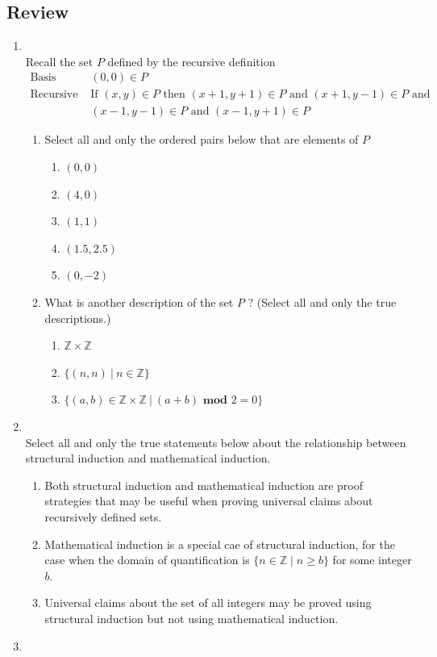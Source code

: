 \documentclass[12pt, oneside]{article}
\begin{document}
\subsection*{Review}
\begin{enumerate}
\item \hspace{1in}\\ 

Recall the set $P$ defined by the recursive definition
\[
\begin{array}{ll}
    \textrm{Basis Step: } & (0,0) \in P\\
     \textrm{Recursive Step: } & \textrm{If } (x,y) \in P \textrm{ then } 
     (x+1, y+1) \in P \textrm{ and } (x+1, y-1) \in P \textrm{ and }\\ 
     & (x-1,y-1) \in P 
     \textrm{ and } (x-1, y+1) \in P
\end{array}
\]
\begin{enumerate}
\item Select all and only the ordered pairs below that are elements of $P$
\begin{enumerate}
\item $(0,0)$
\item $(4,0)$
\item $(1,1)$
\item $(1.5,2.5)$
\item $(0, -2)$
\end{enumerate}
\item What is another description of the set $P$ ? (Select all and only the true descriptions.)
\begin{enumerate}
\item $\mathbb{Z} \times \mathbb{Z}$
\item $\{ (n,n) ~|~ n \in \mathbb{Z} \}$
\item $\{ (a,b) \in \mathbb{Z} \times \mathbb{Z} ~|~ (a+b) \textbf{ mod } 2 =0 \}$
\end{enumerate}
\end{enumerate} \item \hspace{1in}\\ 

Select all and only the true statements below about the relationship between
structural induction and mathematical induction.
\begin{enumerate}
    \item Both structural induction and mathematical induction are proof strategies that 
    may be useful when proving universal claims about recursively defined sets.
    \item Mathematical induction is a special cae of structural induction, for the case when 
    the domain of quantification is $\{ n \in \mathbb{Z} \mid n \geq b\}$ for some integer $b$.
    \item Universal claims about the set of all integers may be proved using structural induction
    but not using mathematical induction.
\end{enumerate} \newpage
\item \hspace{1in}\\ 


\end{enumerate}
\end{document}
